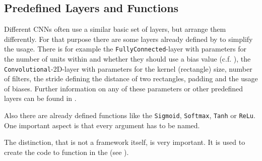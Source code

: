 
\subsection{Predefined Layers and Functions} \label{subsec: CNNArchLang - predefines layers}
Different CNNs often use a similar basic set of layers, but arrange them differently. For that purpose there are some layers already defined by \cnnarch to simplify the usage.
There is for example the \texttt{FullyConnected}-layer with parameters for the number of units within and whether they should use a bias value (c.f. ), the \texttt{Convolutional}-2D-layer with parameters for the kernel (rectangle) size, number of filters, the stride defining the distance of two rectangles, padding and the usage of biases. Further information on any of these parameters or other predefined layers can be found in \cite{CNNArch}.

Also there are already defined functions like the \texttt{Sigmoid}, \texttt{Softmax}, \texttt{Tanh} or \texttt{ReLu}. 
One important aspect is that every argument has to be named. 

The distinction, that \cnnarch is not a framework itself, is very important. It is used to create the code to function in the \mxnet (see ).

